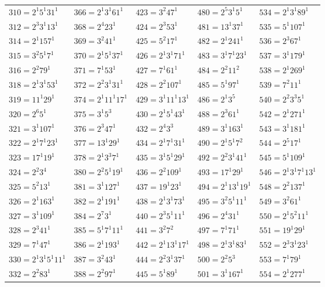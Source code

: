 {\begin{longtable}[c]{*{5}{l}}
$310=2^{1}5^{1}31^{1}$&$366=2^{1}3^{1}61^{1}$&$423=3^{2}47^{1}$&$480=2^{5}3^{1}5^{1}$&$534=2^{1}3^{1}89^{1}$\\
$312=2^{3}3^{1}13^{1}$&$368=2^{4}23^{1}$&$424=2^{3}53^{1}$&$481=13^{1}37^{1}$&$535=5^{1}107^{1}$\\
$314=2^{1}157^{1}$&$369=3^{2}41^{1}$&$425=5^{2}17^{1}$&$482=2^{1}241^{1}$&$536=2^{3}67^{1}$\\
$315=3^{2}5^{1}7^{1}$&$370=2^{1}5^{1}37^{1}$&$426=2^{1}3^{1}71^{1}$&$483=3^{1}7^{1}23^{1}$&$537=3^{1}179^{1}$\\
$316=2^{2}79^{1}$&$371=7^{1}53^{1}$&$427=7^{1}61^{1}$&$484=2^{2}11^{2}$&$538=2^{1}269^{1}$\\
$318=2^{1}3^{1}53^{1}$&$372=2^{2}3^{1}31^{1}$&$428=2^{2}107^{1}$&$485=5^{1}97^{1}$&$539=7^{2}11^{1}$\\
$319=11^{1}29^{1}$&$374=2^{1}11^{1}17^{1}$&$429=3^{1}11^{1}13^{1}$&$486=2^{1}3^{5}$&$540=2^{2}3^{3}5^{1}$\\
$320=2^{6}5^{1}$&$375=3^{1}5^{3}$&$430=2^{1}5^{1}43^{1}$&$488=2^{3}61^{1}$&$542=2^{1}271^{1}$\\
$321=3^{1}107^{1}$&$376=2^{3}47^{1}$&$432=2^{4}3^{3}$&$489=3^{1}163^{1}$&$543=3^{1}181^{1}$\\
$322=2^{1}7^{1}23^{1}$&$377=13^{1}29^{1}$&$434=2^{1}7^{1}31^{1}$&$490=2^{1}5^{1}7^{2}$&$544=2^{5}17^{1}$\\
$323=17^{1}19^{1}$&$378=2^{1}3^{3}7^{1}$&$435=3^{1}5^{1}29^{1}$&$492=2^{2}3^{1}41^{1}$&$545=5^{1}109^{1}$\\
$324=2^{2}3^{4}$&$380=2^{2}5^{1}19^{1}$&$436=2^{2}109^{1}$&$493=17^{1}29^{1}$&$546=2^{1}3^{1}7^{1}13^{1}$\\
$325=5^{2}13^{1}$&$381=3^{1}127^{1}$&$437=19^{1}23^{1}$&$494=2^{1}13^{1}19^{1}$&$548=2^{2}137^{1}$\\
$326=2^{1}163^{1}$&$382=2^{1}191^{1}$&$438=2^{1}3^{1}73^{1}$&$495=3^{2}5^{1}11^{1}$&$549=3^{2}61^{1}$\\
$327=3^{1}109^{1}$&$384=2^{7}3^{1}$&$440=2^{3}5^{1}11^{1}$&$496=2^{4}31^{1}$&$550=2^{1}5^{2}11^{1}$\\
$328=2^{3}41^{1}$&$385=5^{1}7^{1}11^{1}$&$441=3^{2}7^{2}$&$497=7^{1}71^{1}$&$551=19^{1}29^{1}$\\
$329=7^{1}47^{1}$&$386=2^{1}193^{1}$&$442=2^{1}13^{1}17^{1}$&$498=2^{1}3^{1}83^{1}$&$552=2^{3}3^{1}23^{1}$\\
$330=2^{1}3^{1}5^{1}11^{1}$&$387=3^{2}43^{1}$&$444=2^{2}3^{1}37^{1}$&$500=2^{2}5^{3}$&$553=7^{1}79^{1}$\\
$332=2^{2}83^{1}$&$388=2^{2}97^{1}$&$445=5^{1}89^{1}$&$501=3^{1}167^{1}$&$554=2^{1}277^{1}$\\

\end{longtable}}
